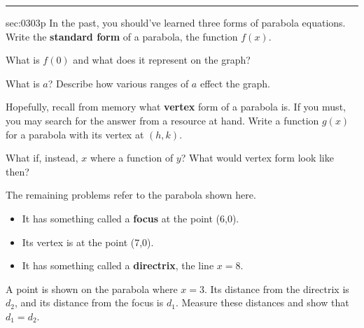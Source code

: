 \renewcommand{\columnseprule}{1.5pt}
\begin{multicols*}{2}
\rule[0.5\baselineskip]{0.4\textwidth}{1pt}
\noindent
{}\label{sec:0303p}
\begin{exercises}{sec:0303p}
\lab[] In the past, you should've learned three forms of parabola equations.
Write the \textbf{standard form} of a parabola, the function
$f(x)$.  

\vspace{2cm}
\lab[] What is $f(0)$ and what does it represent on the graph?

\vspace{2cm}
\lab[] What is $a$?  Describe how various ranges of $a$ effect the graph.

\vspace{3cm}
\lab[] Hopefully, recall from memory what \textbf{vertex} form of a parabola
is.  If you must, you may search for the answer from a resource at hand.
Write a function $g(x)$ for a parabola with its vertex at $(h,k)$.

\vspace{3cm}
\lab[]  What if, instead, $x$ where a function of $y$?  What would vertex form
look like then?

\vspace{2cm}
\lab[] The remaining problems refer to the parabola shown here.
\begin{itemize}
\item It has something called a \textbf{focus} at the point (6,0).
\item Its vertex is at the point (7,0).
\item It has something called a \textbf{directrix}, the line $x=8$.
\end{itemize}
A point is shown on the parabola where $x=3$.  Its distance from the
directrix is $d_2$, and its distance from the focus is $d_1$.  Measure
these distances and show that $d_1 = d_2$.
 
\begin{center}
\end{center}


\end{exercises}
\end{multicols*}
